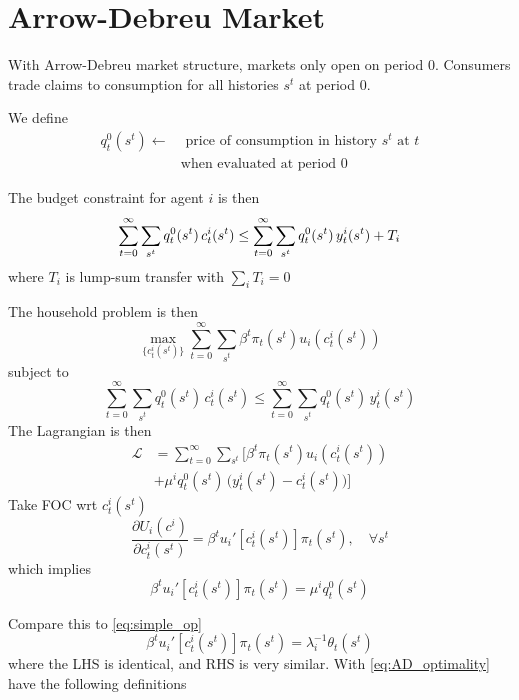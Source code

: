 \documentclass[twocolumn, fleqn]{article}
\numberwithin{equation}{section}
\begin{document}
	\section{Arrow-Debreu Market}
	With Arrow-Debreu market structure, markets only open on period 0. Consumers trade claims to consumption for all histories $s^t$ at period 0. 
	
	We define
	\begin{align*}
		q_t^0(s^t) \leftarrow &\text{ price of consumption in history $s^t$ at $t$} \\
		&\text{when evaluated at period 0}
	\end{align*}	
	
	The budget constraint for agent $i$ is then
	\begin{equation}
		\sum_{t=0}^{\infty} \sum_{s^t} q_t^0(s^t) \, c_t^i(s^t) 
	\leq \sum_{t=0}^{\infty} \sum_{s^t} q_t^0(s^t) \, y_t^i(s^t) + T_i \notag
	\end{equation}
	where $T_i$ is lump-sum transfer with $\sum_i T_i = 0$
	
	The household problem is then
	\begin{equation}
		\max_{\{c_t^i(s^t)\}} \sum_{t=0}^{\infty} \sum_{s^t} \beta^t \pi_t(s^t) u_i (c_t^i(s^t))
	\end{equation}
	subject to 
	\begin{equation}
		\sum_{t=0}^{\infty} \sum_{s^t} q_t^0(s^t) \, c_t^i(s^t) 
	\leq \sum_{t=0}^{\infty} \sum_{s^t} q_t^0(s^t) \, y_t^i(s^t) \label{eq:AD_bc}
	\end{equation}
	The Lagrangian is then
	\begin{align*}
		\mathcal L &= \sum_{t=0}^{\infty} \sum_{s^t} \bigg[ \beta^t \pi_t(s^t) u_i (c_t^i(s^t)) \\
		&+ \mu^i q_t^0(s^t) \, \big(y_t^i(s^t)-c_t^i(s^t)\big) \bigg]
	\end{align*}
	Take FOC wrt $c_t^i(s^t)$
	\[\frac{\partial U_i(c^i)}{\partial c_t^i(s^t)} = \beta^t u_i'\left[c_t^i(s^t)\right] \pi_t(s^t), \quad \forall s^t\]
	which implies 
	\begin{equation}
		\beta^t u_i'\left[c_t^i(s^t)\right] \pi_t(s^t) = \mu^i q_t^0(s^t) \label{eq:AD_optimality}
	\end{equation}
	
	Compare this to \eqref{eq:simple_op}
	\begin{equation}
		\beta^t u_i'\left[c_t^i(s^t)\right] \pi_t(s^t) = \lambda_i^{-1} \theta_t(s^t) \tag{2.4}
	\end{equation}
	where the LHS is identical, and RHS is very similar. With \eqref{eq:AD_optimality} have the following definitions
	\vspace{1em}
	
\end{document}

